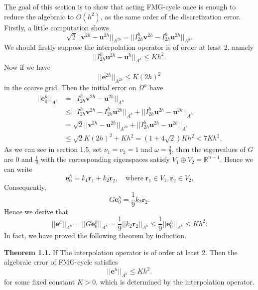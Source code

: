 \documentclass{SBCbookchapter}
\begin{document}
The goal of this section is to show that acting FMG-cycle once is enough to reduce the algebraic to $O(h^2)$, as the same order of the discretization error. Firstly, a little computation shows
\begin{equation}
	\sqrt{2}||\mathbf{v}^{2h}-\mathbf{u}^{2h}||_{A^{2h}}=||I_{2h}^h\mathbf{v}^{2h}-I_{2h}^h\mathbf{u}^{2h}||_{A^h}.
\end{equation}
We should firstly suppose the interpolation operator is of order at least $2$, namely
\begin{equation}
	||I_{2h}^h\mathbf{u}^{2h}-\mathbf{u}^h||_{A^h}\leq Kh^2.
\end{equation}
Now if we have
\begin{equation}
	||\mathbf{e}^{2h}||_{A^{2h}}\leq K(2h)^2
\end{equation}
in the coarse grid. Then the initial error on $\Omega^h$ have
\begin{align}
	||\mathbf{e}_0^h||_{A^h}&=||I_{2h}^h\mathbf{v}^{2h}-\mathbf{u}^{2h}||_{A^h}\nonumber\\
	&\leq ||I_{2h}^h\mathbf{v}^{2h}-I_{2h}^h\mathbf{u}^{2h}||_{A^h}+||I_{2h}^h\mathbf{u}^{2h}-\mathbf{u}^{2h}||_{A^h}\nonumber\\
	&= \sqrt{2}||\mathbf{v}^{2h}-\mathbf{u}^{2h}||_{A^{2h}} + ||I_{2h}^h\mathbf{u}^{2h}-\mathbf{u}^{2h}||_{A^h}\nonumber\\
	&\leq \sqrt{2}K(2h)^2+Kh^2=(1+4\sqrt{2})Kh^2<7Kh^2.
\end{align}
As we can see in section 1.5, set $\nu_1=\nu_2=1$ and $\omega=\frac{2}{3}$, then the eigenvalues of $G$ are $0$ and $\frac{1}{9}$ with the corresponding eigenspaces satisfy $V_1\oplus V_2=\mathbb{R}^{n-1}$. Hence we can write
\begin{equation}
	\mathbf{e}_0^h=k_1\mathbf{r}_1+k_2\mathbf{r}_2,\quad \text{where}\;\mathbf{r}_1\in V_1,\mathbf{r}_2\in V_2.
\end{equation}
Consequently,
\begin{equation}
	G\mathbf{e}_0^h=\frac{1}{9}k_2\mathbf{r}_2.
\end{equation}
Hence we derive that
\begin{equation}
	||\mathbf{e}^h||_{A^h}=||G\mathbf{e}_0^h||_{A^h}=\frac{1}{9}||k_2\mathbf{r}_2||_{A^h}\leq \frac{1}{9}||\mathbf{e}_0^h||_{A^h}\leq Kh^2.
\end{equation}
In fact, we have proved the following theorem by induction.

\textbf{Theorem 1.1.} If The interpolation operator is of order at least $2$. Then the algebraic error of FMG-cycle satisfies
\begin{equation}
	||\mathbf{e}^h||_{A^h}\leq Kh^2.
\end{equation}
for some fixed constant $K>0$, which is determined by the interpolation operator.
\end{document}
